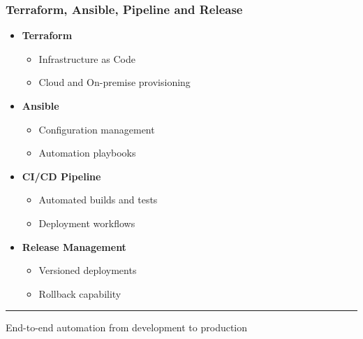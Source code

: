 \documentclass{beamer}
\begin{document}
\begin{frame}

\frametitle{Terraform, Ansible, Pipeline and Release}
\begin{itemize}
    \item \textcolor{soleneBlue}{\textbf{Terraform}}
    \begin{itemize}
        \item Infrastructure as Code
        \item Cloud and On-premise provisioning
    \end{itemize}
    
    \vspace{0.3cm}
    
    \item \textcolor{soleneBlue}{\textbf{Ansible}}
    \begin{itemize}
        \item Configuration management
        \item Automation playbooks
    \end{itemize}
    
    \vspace{0.3cm}
    
    \item \textcolor{soleneBlue}{\textbf{CI/CD Pipeline}}
    \begin{itemize}
        \item Automated builds and tests
        \item Deployment workflows
    \end{itemize}
    
    \vspace{0.3cm}
    
    \item \textcolor{soleneBlue}{\textbf{Release Management}}
    \begin{itemize}
        \item Versioned deployments
        \item Rollback capability
    \end{itemize}
\end{itemize}

\begin{center}
\textcolor{soleneBlue}{\rule{0.8\textwidth}{1pt}}
\end{center}

\footnotesize
\begin{center}
\textcolor{soleneBlue}{End-to-end automation from development to production}
\end{center}
\end{frame}
\end{document}
